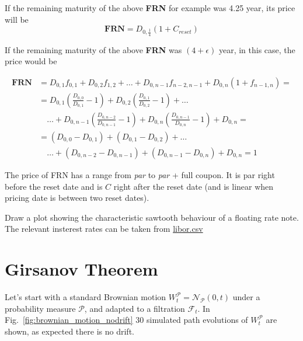 \documentclass[12pt,a4paper]{article}
\begin{document}
If the remaining maturity of the above \textbf{FRN} for example was 4.25 year, its price will be
\begin{equation}
\textbf{FRN} = D_{0,\frac{1}{4}}(1+C_{reset})
\end{equation}

If the remaining maturity of the above \textbf{FRN} was $(4 + \epsilon)$ year, in this case, the price would be

\begin{equation}
\begin{aligned}
\textbf{FRN} &= D_{0,1}f_{0,1}+ D_{0,2}f_{1,2} + \ldots + D_{0,n-1}f_{n-2,n-1} + D_{0,n}(1+f_{n-1,n}) = \\
& = D_{0,1}\left(\frac{D_{0,0}}{D_{0,1}}-1\right) + D_{0,2}\left(\frac{D_{0,1}}{D_{0,2}}-1\right) + \ldots \\
&\quad\ldots + D_{0,n-1}\left(\frac{D_{0,n-2}}{D_{0,n-1}}-1\right) + D_{0,n}\left(\frac{D_{0,n-1}}{D_{0,n}}-1\right) + D_{0,n} = \\
&= (D_{0,0}-D_{0,1})+(D_{0,1}-D_{0,2}) + \ldots \\
&\quad\ldots + (D_{0,n-2}-D_{0,n-1})+(D_{0,n-1}-D_{0,n})+D_{0,n} = 1
\end{aligned}
\end{equation}

The price of FRN has a range from \emph{par} to \emph{par} + full coupon. It is par right before the reset date and is $C$ right after the reset date (and is linear when pricing date is between two reset dates).

\begin{question}
Draw a plot showing the characteristic sawtooth behaviour of a floating rate note. The relevant insterest rates can be taken from \href{https://raw.githubusercontent.com/matteosan1/advanced\_financial\_modeling/master/input_files/libor.csv}{libor.csv}
\end{question}

\clearpage
\section{Girsanov Theorem}
Let’s start with a standard Brownian motion $W_t^{\mathcal{P}} = \mathcal{N}_{\mathcal{P}}(0,t)$ under a probability measure $\mathcal{P}$, and adapted to a filtration $\mathcal{F}_t$. In Fig.~\ref{fig:brownian_motion_nodrift} 30 simulated path evolutions of $W_t^{\mathcal{P}}$ are shown, as expected there is no drift.
	
\end{document}
